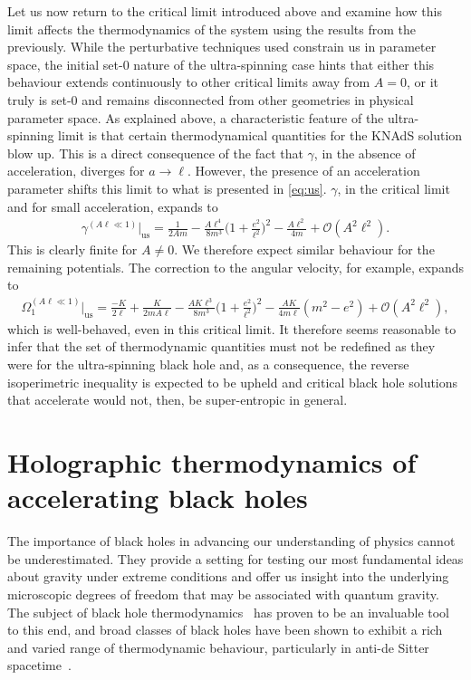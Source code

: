 \documentclass[
twoside,
openright,
frontopenright,
]{dmathesis}
\begin{document}
Let us now return to the critical limit introduced above and examine how this
limit affects the thermodynamics of the system using the results from the
previously. While the perturbative techniques used constrain us in parameter
space, the initial set-0 nature of the ultra-spinning case hints that either
this behaviour extends continuously to other critical limits away from $A=0$, or
it truly is set-0 and remains disconnected from other geometries in physical
parameter space. As explained above, a characteristic feature of the
ultra-spinning limit is that certain thermodynamical quantities for the KNAdS
solution blow up. This is a direct consequence of the fact that $\gamma$, in the
absence of acceleration, diverges for $a\to\ell$. However, the presence of an
acceleration parameter shifts this limit to what is presented in
\cref{eq:us}. $\gamma$, in the critical limit and for small acceleration,
expands to
\begin{align}
\gamma^{(A\ell\ll 1)}\Big|_{\mathrm{us}}=\frac{1}{2Am} - \frac{A\ell^4}{8m^3}\Big(1+\frac{e^2}{\ell^2}\Big)^2-\frac{A\ell^2}{4m}+\mathcal{O}(A^2\ell^2).
\end{align}
This is clearly finite for $A\neq 0$. We therefore expect similar behaviour for
the remaining potentials. The correction to the angular velocity, for example,
expands to
\begin{align}
\Omega_1^{(A\ell\ll 1)}\Big|_{\mathrm{us}} = \frac{-K}{2\ell}+\frac{K}{2mA\ell}-\frac{A K\ell^3}{8m^3}\Big(1+\frac{e^2}{\ell^2}\Big)^2-\frac{A K}{4 m\ell}(m^2-e^2)+\mathcal{O}(A^2\ell^2),
\end{align}
which is well-behaved, even in this critical limit. It therefore seems
reasonable to infer that the set of thermodynamic quantities must not be
redefined as they were for the ultra-spinning black hole and, as a consequence,
the reverse isoperimetric inequality is expected to be upheld and critical black
hole solutions that accelerate would not, then, be super-entropic in general.

\chapter{Holographic thermodynamics of accelerating black holes}
\label{cha:holoTD} 

The importance of black holes in advancing our understanding of physics cannot
be underestimated.  They provide a setting for testing our most fundamental
ideas about gravity under extreme conditions and offer us insight into the
underlying microscopic degrees of freedom that may be associated with quantum
gravity.  The subject of black hole thermodynamics~\cite{Bekenstein:1973ur,
  Bekenstein:1974ax,Hawking:1974sw} has proven to be an invaluable tool to this
end, and broad classes of black holes have been shown to exhibit a rich and
varied range of thermodynamic behaviour, particularly in anti-de Sitter
spacetime~\cite{Kubiznak:2016qmn}.
\end{document}

